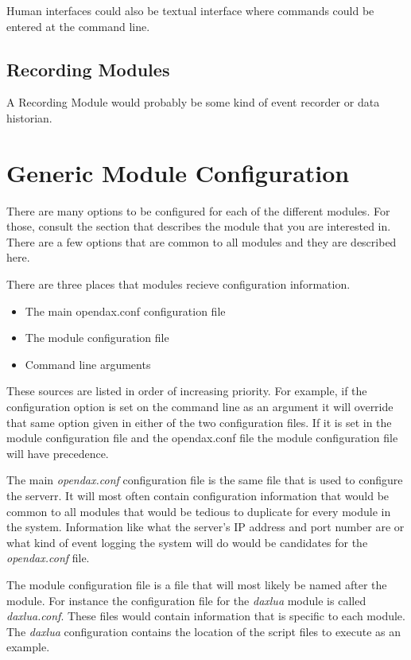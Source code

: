 Human interfaces could also be textual interface where commands could be entered at the command line.

\subsection*{Recording Modules}
A Recording Module would probably be some kind of event recorder or data historian.

\section{Generic Module Configuration}
There are many options to be configured for each of the different modules.  For those, consult the section that describes the module that you are interested in.  There are a few options that are common to all modules and they are described here.

There are three places that modules recieve configuration information.

\begin{itemize}
\item The main opendax.conf configuration file
\item The module configuration file
\item Command line arguments
\end{itemize}

These sources are listed in order of increasing priority.  For example, if the configuration option is set on the command line as an argument it will override that same option given in either of the two configuration files.  If it is set in the module configuration file and the opendax.conf file the module configuration file will have precedence.

The main \emph{opendax.conf} configuration file is the same file that is used to configure the serverr.  It will most often contain configuration information that would be common to all modules that would be tedious to duplicate for every module in the system.  Information like what the server's IP address and port number are or what kind of event logging the system will do would be candidates for the \emph{opendax.conf} file.

The module configuration file is a file that will most likely be named after the module.  For instance the configuration file for the \emph{daxlua} module is called \emph{daxlua.conf}.  These files would contain information that is specific to each module.  The \emph{daxlua} configuration contains the location of the script files to execute as an example.

